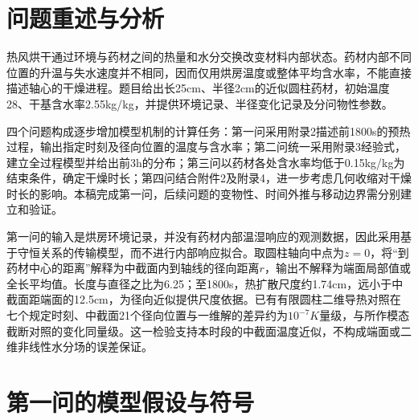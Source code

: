 \section{问题重述与分析}
热风烘干通过环境与药材之间的热量和水分交换改变材料内部状态。药材内部不同位置的升温与失水速度并不相同，因而仅用烘房温度或整体平均含水率，不能直接描述轴心的干燥进程。题目给出长25\unit{cm}、半径2\unit{cm}的近似圆柱药材，初始温度28\celsius、干基含水率2.55\unit{kg/kg}，并提供环境记录、半径变化记录及分问物性参数\cite{problem}。

四个问题构成逐步增加模型机制的计算任务：第一问采用附录2描述前1800\unit{s}的预热过程，输出指定时刻及径向位置的温度与含水率；第二问统一采用附录3经验式，建立全过程模型并给出前3\unit{h}的分布；第三问以药材各处含水率均低于0.15\unit{kg/kg}为结束条件，确定干燥时长；第四问结合附件2及附录4，进一步考虑几何收缩对干燥时长的影响。本稿完成第一问，后续问题的变物性、时间外推与移动边界需分别建立和验证。

第一问的输入是烘房环境记录，并没有药材内部温湿响应的观测数据，因此采用基于守恒关系的传输模型，而不进行内部响应拟合。取圆柱轴向中点为$z=0$，将“到药材中心的距离”解释为中截面内到轴线的径向距离$r$，输出不解释为端面局部值或全长平均值。长度与直径之比为6.25；至1800\unit{s}，热扩散尺度约1.74\unit{cm}，远小于中截面距端面的12.5\unit{cm}，为径向近似提供尺度依据。已有有限圆柱二维导热对照在七个规定时刻、中截面21个径向位置与一维解的差异约为$10^{-7}\unit{K}$量级，与所作模态截断对照的变化同量级。这一检验支持本时段的中截面温度近似，不构成端面或二维非线性水分场的误差保证。

\section{第一问的模型假设与符号}
